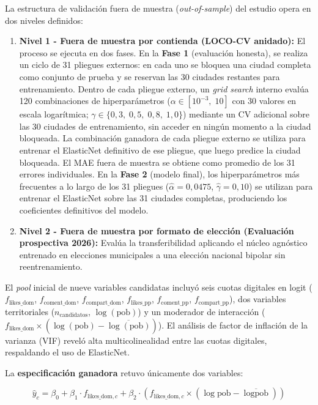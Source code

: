 La estructura de validación fuera de muestra (\textit{out-of-sample}) del estudio opera en dos niveles definidos:
\begin{enumerate}
    \item \textbf{Nivel 1 - Fuera de muestra por contienda (LOCO-CV anidado):} El proceso se ejecuta en dos fases. En la \textbf{Fase 1} (evaluación honesta), se realiza un ciclo de 31 pliegues externos: en cada uno se bloquea una ciudad completa como conjunto de prueba y se reservan las 30 ciudades restantes para entrenamiento. Dentro de cada pliegue externo, un \textit{grid search} interno evalúa 120 combinaciones de hiperparámetros ($\alpha \in [10^{-3},\; 10]$ con 30 valores en escala logarítmica; $\gamma \in \{0{,}3,\; 0{,}5,\; 0{,}8,\; 1{,}0\}$) mediante un CV adicional sobre las 30 ciudades de entrenamiento, sin acceder en ningún momento a la ciudad bloqueada. La combinación ganadora de cada pliegue externo se utiliza para entrenar el ElasticNet definitivo de ese pliegue, que luego predice la ciudad bloqueada. El MAE fuera de muestra se obtiene como promedio de los 31 errores individuales. En la \textbf{Fase 2} (modelo final), los hiperparámetros más frecuentes a lo largo de los 31 pliegues ($\hat{\alpha} = 0{,}0475$, $\hat{\gamma} = 0{,}10$) se utilizan para entrenar el ElasticNet sobre las 31 ciudades completas, produciendo los coeficientes definitivos del modelo.
    \item \textbf{Nivel 2 - Fuera de muestra por formato de elección (Evaluación prospectiva 2026):} Evalúa la transferibilidad aplicando el núcleo agnóstico entrenado en elecciones municipales a una elección nacional bipolar sin reentrenamiento.
\end{enumerate}

El \textit{pool} inicial de nueve variables candidatas incluyó seis cuotas digitales en logit ($f_{\text{likes\_dom}}$, $f_{\text{coment\_dom}}$, $f_{\text{compart\_dom}}$, $f_{\text{likes\_pp}}$, $f_{\text{coment\_pp}}$, $f_{\text{compart\_pp}}$), dos variables territoriales ($n_{\text{candidatos}}$, $\log(\text{pob})$) y un moderador de interacción ($f_{\text{likes\_dom}} \times (\log(\text{pob}) - \overline{\log(\text{pob})})$). El análisis de factor de inflación de la varianza (VIF) reveló alta multicolinealidad entre las cuotas digitales, respaldando el uso de ElasticNet.

La \textbf{especificación ganadora} retuvo únicamente dos variables:

\begin{equation}
    \hat{y}_c = \beta_0 + \beta_1 \cdot f_{\text{likes\_dom},c} + \beta_2 \cdot (f_{\text{likes\_dom},c} \times (\log\text{pob} - \overline{\log\text{pob}}))
    \label{eq:elasticnet-ganador}
\end{equation}

